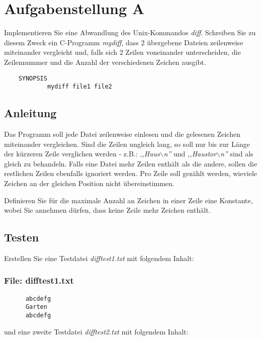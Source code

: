 




\section*{Aufgabenstellung A}
Implementieren Sie eine Abwandlung des Unix-Kommandos \emph{diff}.
Schreiben Sie zu diesem Zweck ein C-Programm
\emph{mydiff}, dass 2 übergebene Dateien zeilenweise
miteinander vergleicht und, falls sich 2 Zeilen voneinander
unterscheiden, die Zeilennummer und die Anzahl der
verschiedenen Zeichen ausgibt.

\begin{verbatim}
	SYNOPSIS
      		mydiff file1 file2
\end{verbatim}


\subsection*{Anleitung}
      Das Programm soll jede Datei zeilenweise einlesen und die
      gelesenen Zeichen miteinander vergleichen. Sind die Zeilen
      ungleich lang, so soll nur bis zur Länge der kürzeren Zeile
      verglichen werden - z.B.: \emph{,,Haus$\backslash$n''} und \emph{,,Haustor$\backslash$n''}
      sind als gleich zu behandeln. Falls eine Datei mehr Zeilen enthält
      als die andere, sollen die restlichen Zeilen ebenfalls ignoriert
      werden. Pro Zeile soll gezählt werden, wieviele Zeichen an der
      gleichen Position nicht übereinstimmen.


      Definieren Sie für die maximale Anzahl an Zeichen in einer
      Zeile eine Konstante, wobei Sie annehmen dürfen, dass keine
      Zeile mehr Zeichen enthält.

\subsection*{Testen}
Erstellen Sie eine Testdatei \emph{difftest1.txt} mit folgendem Inhalt:
\subsubsection*{File: difftest1.txt}
\begin{verbatim}
      abcdefg
      Garten
      abcdefg
\end{verbatim}
      und eine zweite Testdatei \emph{difftest2.txt} mit
      folgendem Inhalt:
